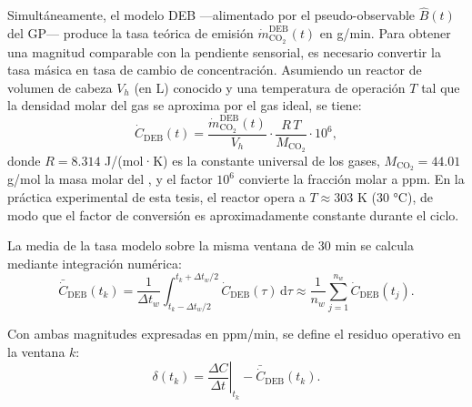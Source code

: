 Simultáneamente, el modelo DEB —alimentado por el pseudo-observable $\hat{B}(t)$ del GP— produce la tasa teórica de emisión $\dot{m}_{\mathrm{CO_2}}^{\mathrm{DEB}}(t)$ en g/min. Para obtener una magnitud comparable con la pendiente sensorial, es necesario convertir la tasa másica en tasa de cambio de concentración. Asumiendo un reactor de volumen de cabeza $V_h$ (en L) conocido y una temperatura de operación $T$ tal que la densidad molar del gas se aproxima por el gas ideal, se tiene:
\begin{equation}
    \label{eq:cap4_conversion_masa_ppm}
    \dot{C}_{\mathrm{DEB}}(t) =
    \frac{\dot{m}_{\mathrm{CO_2}}^{\mathrm{DEB}}(t)}{V_h}
    \cdot \frac{R\,T}{M_{\mathrm{CO_2}}}
    \cdot 10^{6},
\end{equation}
donde $R = \num{8.314}$ J/(mol·K) es la constante universal de los gases, $M_{\mathrm{CO_2}} = \num{44.01}$ g/mol la masa molar del , y el factor $10^{6}$ convierte la fracción molar a ppm. En la práctica experimental de esta tesis, el reactor opera a $T \approx \num{303}$ K (\num{30} °C), de modo que el factor de conversión es aproximadamente constante durante el ciclo.

La media de la tasa modelo sobre la misma ventana de \num{30} min se calcula mediante integración numérica:
\begin{equation}
    \label{eq:cap4_media_modelo_ventana}
    \bar{\dot{C}}_{\mathrm{DEB}}(t_k) =
    \frac{1}{\Delta t_w}\int_{t_k - \Delta t_w/2}^{t_k + \Delta t_w/2}
    \dot{C}_{\mathrm{DEB}}(\tau)\,\mathrm{d}\tau
    \approx \frac{1}{n_w}\sum_{j=1}^{n_w}\dot{C}_{\mathrm{DEB}}(t_j).
\end{equation}

Con ambas magnitudes expresadas en ppm/min, se define el residuo operativo en la ventana $k$:
\begin{equation}
    \label{eq:cap4_residuo_operativo}
    \delta(t_k) =
    \left.\frac{\Delta C}{\Delta t}\right|_{t_k} -
    \bar{\dot{C}}_{\mathrm{DEB}}(t_k).
\end{equation}


